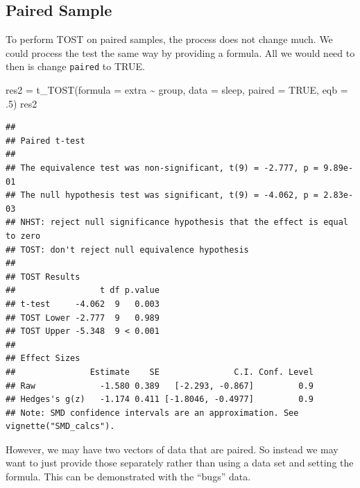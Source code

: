 \documentclass[]{interact}
\theoremstyle{plain}%
\theoremstyle{definition}
\theoremstyle{remark}
\newenvironment{Shaded}{\begin{snugshade}}{\end{snugshade}}
\newcommand{\AttributeTok}[1]{\textcolor[rgb]{0.77,0.63,0.00}{#1}}
\newcommand{\ConstantTok}[1]{\textcolor[rgb]{0.00,0.00,0.00}{#1}}
\newcommand{\DecValTok}[1]{\textcolor[rgb]{0.00,0.00,0.81}{#1}}
\newcommand{\FunctionTok}[1]{\textcolor[rgb]{0.00,0.00,0.00}{#1}}
\newcommand{\NormalTok}[1]{#1}
\newcommand{\OtherTok}[1]{\textcolor[rgb]{0.56,0.35,0.01}{#1}}
\newcommand{\SpecialCharTok}[1]{\textcolor[rgb]{0.00,0.00,0.00}{#1}}
\begin{document}
\newpage

\hypertarget{paired-sample}{%
\subsection{Paired Sample}\label{paired-sample}}

To perform TOST on paired samples, the process does not change much. We
could process the test the same way by providing a formula. All we would
need to then is change \texttt{paired} to TRUE.

\begin{Shaded}
\begin{Highlighting}[]
\NormalTok{res2 }\OtherTok{=} \FunctionTok{t\_TOST}\NormalTok{(}\AttributeTok{formula =}\NormalTok{ extra }\SpecialCharTok{\textasciitilde{}}\NormalTok{ group,}
              \AttributeTok{data =}\NormalTok{ sleep,}
              \AttributeTok{paired =} \ConstantTok{TRUE}\NormalTok{,}
              \AttributeTok{eqb =}\NormalTok{ .}\DecValTok{5}\NormalTok{)}
\NormalTok{res2}
\end{Highlighting}
\end{Shaded}

\begin{verbatim}
## 
## Paired t-test
## 
## The equivalence test was non-significant, t(9) = -2.777, p = 9.89e-01
## The null hypothesis test was significant, t(9) = -4.062, p = 2.83e-03
## NHST: reject null significance hypothesis that the effect is equal to zero 
## TOST: don't reject null equivalence hypothesis
## 
## TOST Results 
##                 t df p.value
## t-test     -4.062  9   0.003
## TOST Lower -2.777  9   0.989
## TOST Upper -5.348  9 < 0.001
## 
## Effect Sizes 
##               Estimate    SE               C.I. Conf. Level
## Raw             -1.580 0.389   [-2.293, -0.867]         0.9
## Hedges's g(z)   -1.174 0.411 [-1.8046, -0.4977]         0.9
## Note: SMD confidence intervals are an approximation. See vignette("SMD_calcs").
\end{verbatim}

\newpage

However, we may have two vectors of data that are paired. So instead we
may want to just provide those separately rather than using a data set
and setting the formula. This can be demonstrated with the ``bugs''
data.

\begin{Shaded}
\end{Shaded}
\end{document}
